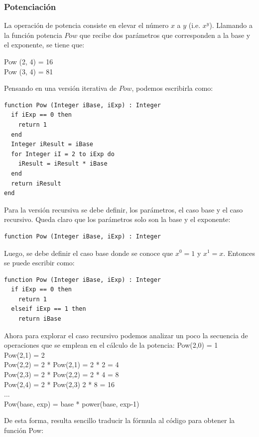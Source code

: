 \subsubsection{Potenciación}
La operación de potencia consiste en elevar el número $x$ a $y$ (i.e. $x^y$). Llamando a la función potencia $Pow$ que recibe dos parámetros que corresponden a la base y el exponente, se tiene que:

Pow (2, 4) = 16 \\
Pow (3, 4) = 81

Pensando en una versión iterativa de $Pow$, podemos escribirla como:

\begin{lstlisting}[upquote=true, language=pseudo]
function Pow (Integer iBase, iExp) : Integer
  if iExp == 0 then
    return 1
  end
  Integer iResult = iBase
  for Integer iI = 2 to iExp do
    iResult = iResult * iBase
  end
  return iResult
end
\end{lstlisting}

Para la versión recursiva se debe definir, los parámetros, el caso base y el caso recursivo. Queda claro que los parámetros solo son la base y el exponente:

\begin{lstlisting}[upquote=true, language=pseudo]
function Pow (Integer iBase, iExp) : Integer
\end{lstlisting}

Luego, se debe definir el caso base donde se conoce que $x^0 = 1$ y $x^1 = x$. Entonces se puede escribir como:

\begin{lstlisting}[upquote=true, language=pseudo]
function Pow (Integer iBase, iExp) : Integer
  if iExp == 0 then
    return 1
  elseif iExp == 1 then
    return iBase
\end{lstlisting}

Ahora para explorar el caso recursivo podemos analizar un poco la secuencia de operaciones que se emplean en el cálculo de la potencia:
Pow(2,0) = 1 \\
Pow(2,1) = 2 \\
Pow(2,2) = 2 * Pow(2,1) = 2 * 2 = 4 \\
Pow(2,3) = 2 * Pow(2,2) = 2 * 4 = 8 \\
Pow(2,4) = 2 * Pow(2,3) 2 * 8 = 16 \\
... \\
Pow(base, exp) = base * power(base, exp-1)

De esta forma, resulta sencillo traducir la fórmula al código para obtener la función Pow:

